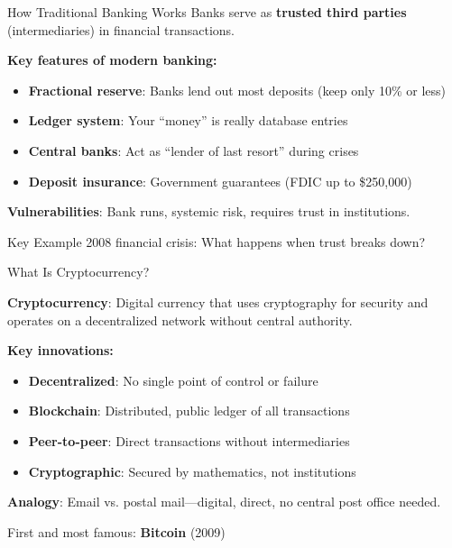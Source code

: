 ﻿\documentclass[aspectratio=169,11pt]{beamer}
\begin{document}
\begin{frame}{How Traditional Banking Works}
Banks serve as \textbf{trusted third parties} (intermediaries) in financial transactions.

\vspace{0.3em}
\textbf{Key features of modern banking:}
\begin{itemize}
    \item \textbf{Fractional reserve}: Banks lend out most deposits (keep only 10\% or less)
    \item \textbf{Ledger system}: Your ``money'' is really database entries
    \item \textbf{Central banks}: Act as ``lender of last resort'' during crises
    \item \textbf{Deposit insurance}: Government guarantees (FDIC up to \$250,000)
\end{itemize}

\vspace{0.3em}
\textbf{Vulnerabilities}: Bank runs, systemic risk, requires trust in institutions.

\begin{alertblock}{Key Example}
2008 financial crisis: What happens when trust breaks down?
\end{alertblock}
\end{frame}

\begin{frame}{What Is Cryptocurrency?}
\begin{argumentbox}[Definition]
\textbf{Cryptocurrency}: Digital currency that uses cryptography for security and operates on a decentralized network without central authority.
\end{argumentbox}

\vspace{0.3em}
\textbf{Key innovations:}
\begin{itemize}
    \item \textbf{Decentralized}: No single point of control or failure
    \item \textbf{Blockchain}: Distributed, public ledger of all transactions
    \item \textbf{Peer-to-peer}: Direct transactions without intermediaries
    \item \textbf{Cryptographic}: Secured by mathematics, not institutions
\end{itemize}

\vspace{0.3em}
\textbf{Analogy}: Email vs. postal mail---digital, direct, no central post office needed.

First and most famous: \textbf{Bitcoin} (2009)
\end{frame}
\end{document}
